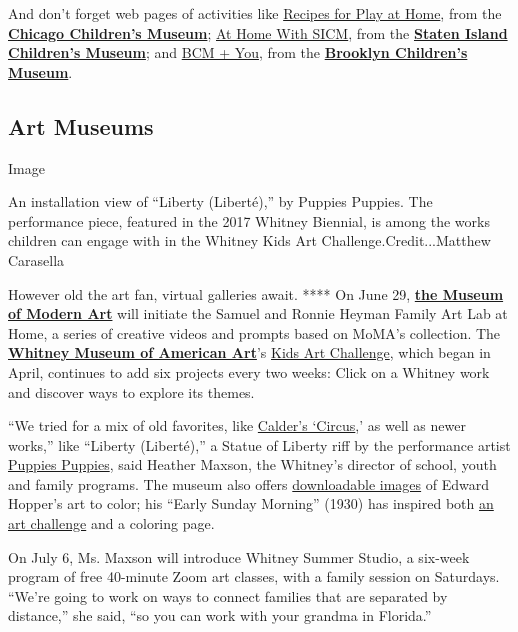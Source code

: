 And don't forget web pages of activities like
\href{https://www.chicagochildrensmuseum.org/recipes-for-play-at-home}{Recipes
for Play at Home}, from the
\textbf{\href{https://www.chicagochildrensmuseum.org/}{Chicago
Children's Museum}};
\href{https://sichildrensmuseum.org/at-home-with-sicm/}{At Home With
SICM}, from the \textbf{\href{https://sichildrensmuseum.org/}{Staten
Island Children's Museum}}; and
\href{https://www.brooklynkids.org/bcm-and-you/}{BCM + You}, from the
\textbf{\href{https://www.brooklynkids.org/}{Brooklyn Children's
Museum}}.

\hypertarget{art-museums}{%
\subsection{Art Museums}\label{art-museums}}

Image

An installation view of ``Liberty (Liberté),'' by Puppies Puppies. The
performance piece, featured in the 2017 Whitney Biennial, is among the
works children can engage with in the Whitney Kids Art
Challenge.Credit...Matthew Carasella

However old the art fan, virtual galleries await. **** On June 29,
\textbf{\href{https://www.moma.org/visit/families}{the Museum of Modern
Art}} will initiate the Samuel and Ronnie Heyman Family Art Lab at Home,
a series of creative videos and prompts based on MoMA's collection. The
\textbf{\href{https://whitney.org/}{Whitney Museum of American Art}}'s
\href{https://whitney.org/families/kids-art-challenge}{Kids Art
Challenge}, which began in April, continues to add six projects every
two weeks: Click on a Whitney work and discover ways to explore its
themes.

``We tried for a mix of old favorites, like
\href{https://whitney.org/families/kids-art-challenge/alexander-calder}{Calder's
`Circus},' as well as newer works,'' like ``Liberty (Liberté),'' a
Statue of Liberty riff by the performance artist
\href{https://www.artspace.com/magazine/interviews_features/material-art-fair-2016/puppies-puppies-interview-53446}{Puppies
Puppies}, said Heather Maxson, the Whitney's director of school, youth
and family programs. The museum also offers
\href{https://whitney.org/whitney-from-home/hopper-coloring}{downloadable
images} of Edward Hopper's art to color; his ``Early Sunday Morning''
(1930) has inspired both
\href{https://whitney.org/families/kids-art-challenge/edward-hopper}{an
art challenge} and a coloring page.

On July 6, Ms. Maxson will introduce Whitney Summer Studio, a six-week
program of free 40-minute Zoom art classes, with a family session on
Saturdays. ``We're going to work on ways to connect families that are
separated by distance,'' she said, ``so you can work with your grandma
in Florida.''

